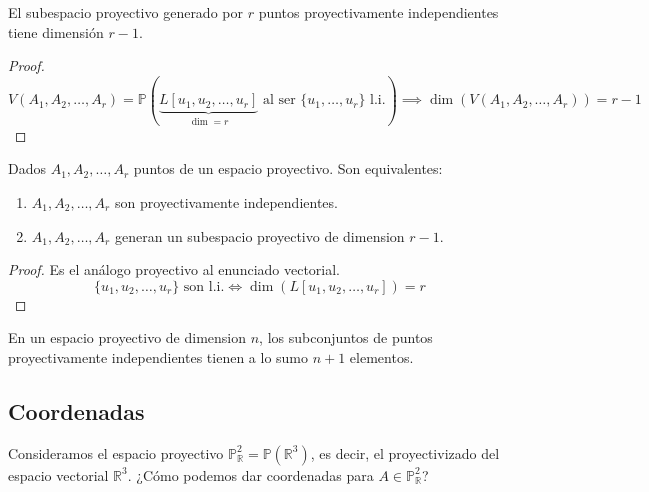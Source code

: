 \begin{corolario}
    El subespacio proyectivo generado por $r$ puntos proyectivamente independientes tiene dimensión $r-1$.
\end{corolario}

\begin{proof}
    \[
    V(A_1, A_2, \ldots, A_r) = \mathbb{P}(\underbrace{L[u_1, u_2, \ldots, u_r]}_{\dim = r} \text{ al ser } \{u_1, \ldots, u_r\} \text{ l.i.}) \implies \dim(V(A_1, A_2, \ldots, A_r)) = r-1
    \]
\end{proof}


\begin{lema}
    Dados $A_1, A_2, \ldots, A_r$ puntos de un espacio proyectivo. Son equivalentes:
    \begin{enumerate}
        \item $A_1, A_2, \ldots, A_r$ son proyectivamente independientes.
        \item $A_1, A_2, \ldots, A_r$ generan un subespacio proyectivo de dimension $r-1$.
    \end{enumerate}
\end{lema}

\begin{proof}
    Es el análogo proyectivo al enunciado vectorial.
    \[
        \{u_1, u_2, \ldots, u_r\} \text{ son l.i.} \iff \dim(L[u_1, u_2, \ldots, u_r]) = r
    \]
\end{proof}

\begin{corolario}
    En un espacio proyectivo de dimension $n$, los subconjuntos de puntos proyectivamente independientes tienen a lo sumo $n+1$ elementos.
\end{corolario}


\subsection{Coordenadas}

Consideramos el espacio proyectivo $\mathbb{P}^2_{\mathbb{R}} = \mathbb{P}(\mathbb{R}^3)$, es decir, el proyectivizado del espacio vectorial $\mathbb{R}^3$. ¿Cómo podemos dar coordenadas para $A \in \mathbb{P}^2_{\mathbb{R}}$?

